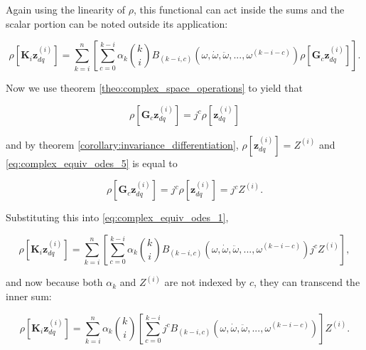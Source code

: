 	Again using the linearity of $\rho$, this functional can act inside the sums and the scalar portion can be noted outside its application:

\begin{equation} \rho\left[\mathbf{K}_i\mathbf{z}^{(i)}_{dq}\right] = \sum\limits_{k=i}^{n} \left[ \sum\limits_{c=0}^{k-i} \alpha_k{k\choose i} B_{\left(k-i,c\right)}\left(\omega,\dot{\omega},\ddot{\omega},...,\omega^{(k-i-c)}\right)  \rho\left[\mathbf{G}_c\mathbf{z}^{(i)}_{dq}\right] \right]. \label{eq:complex_equiv_odes_1}\end{equation}

	Now we use theorem \ref{theo:complex_space_operations} to yield that

\begin{equation} \rho\left[\mathbf{G}_c\mathbf{z}^{(i)}_{dq}\right] = j^c \rho\left[\mathbf{z}^{(i)}_{dq}\right] \label{eq:complex_equiv_odes_5}\end{equation}

	\noindent and by theorem \ref{corollary:invariance_differentiation}, $\rho\left[\mathbf{z}^{(i)}_{dq}\right] = Z^{(i)}$ and \eqref{eq:complex_equiv_odes_5} is equal to

\begin{equation} \rho\left[\mathbf{G}_c\mathbf{z}^{(i)}_{dq}\right] = j^c \rho\left[\mathbf{z}^{(i)}_{dq}\right] = j^c Z^{(i)}.\end{equation}

	Substituting this into \eqref{eq:complex_equiv_odes_1},

\begin{equation} \rho\left[\mathbf{K}_i\mathbf{z}^{(i)}_{dq}\right] = \sum\limits_{k=i}^{n} \left[ \sum\limits_{c=0}^{k-i} \alpha_k{k\choose i} B_{\left(k-i,c\right)}\left(\omega,\dot{\omega},\ddot{\omega},...,\omega^{(k-i-c)}\right)  j^c Z^{(i)} \right], \label{eq:complex_equiv_odes_2}\end{equation}

	\noindent and now because both $\alpha_k$ and $Z^{(i)}$ are not indexed by $c$, they can transcend the inner sum:

\begin{equation} \rho\left[\mathbf{K}_i\mathbf{z}^{(i)}_{dq}\right] = \sum\limits_{k=i}^{n} \alpha_k{k\choose i}\left[ \sum\limits_{c=0}^{k-i} j^c B_{\left(k-i,c\right)}\left(\omega,\dot{\omega},\ddot{\omega},...,\omega^{(k-i-c)}\right)\right] Z^{(i)}. \label{eq:complex_equiv_odes_3}\end{equation}

